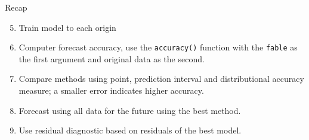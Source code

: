 \documentclass[
  14pt,
  ignorenonframetext,
  aspectratio=169,
]{beamer}
\providecommand{\tightlist}{%
  \setlength{\itemsep}{0pt}\setlength{\parskip}{0pt}}
\begin{document}
\begin{frame}[fragile]{Recap}
\protect{}\label{recap-2}
\fontsize{12}{12}\sf

\begin{enumerate}
\setcounter{enumi}{4}
\tightlist
\item
  Train model to each origin
\item
  Computer forecast accuracy, use the \texttt{accuracy()} function with
  the \texttt{fable} as the first argument and original data as the
  second.
\item
  Compare methods using point, prediction interval and distributional
  accuracy measure; a smaller error indicates higher accuracy.
\item
  Forecast using all data for the future using the best method.
\item
  Use residual diagnostic based on residuals of the best model.
\end{enumerate}
\end{frame}
\end{document}
